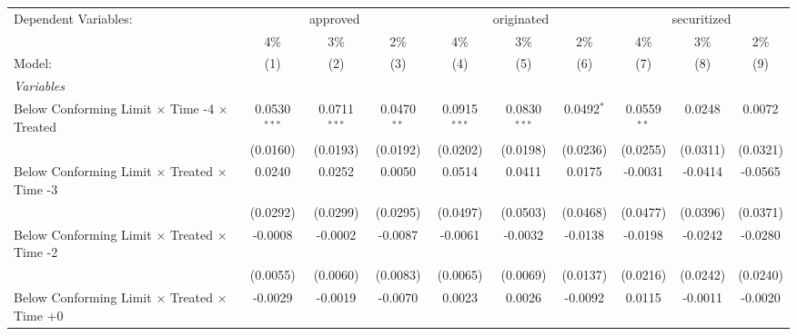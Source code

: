 \begingroup
\centering
\begin{tabular}{lccccccccc}
   \tabularnewline \midrule \midrule
   Dependent Variables: & \multicolumn{3}{c}{approved} & \multicolumn{3}{c}{originated} & \multicolumn{3}{c}{securitized}\\
                                                              & 4\%            & 3\%            & 2\%            & 4\%            & 3\%            & 2\%           & 4\%            & 3\%           & 2\% \\    
   Model:                                                     & (1)            & (2)            & (3)            & (4)            & (5)            & (6)           & (7)            & (8)           & (9)\\  
   \midrule
   \emph{Variables}\\
   Below Conforming Limit $\times$ Time -4 $\times$ Treated   & 0.0530$^{***}$ & 0.0711$^{***}$ & 0.0470$^{**}$  & 0.0915$^{***}$ & 0.0830$^{***}$ & 0.0492$^{*}$  & 0.0559$^{**}$  & 0.0248        & 0.0072\\   
                                                              & (0.0160)       & (0.0193)       & (0.0192)       & (0.0202)       & (0.0198)       & (0.0236)      & (0.0255)       & (0.0311)      & (0.0321)\\   
   Below Conforming Limit $\times$ Treated $\times$ Time -3   & 0.0240         & 0.0252         & 0.0050         & 0.0514         & 0.0411         & 0.0175        & -0.0031        & -0.0414       & -0.0565\\   
                                                              & (0.0292)       & (0.0299)       & (0.0295)       & (0.0497)       & (0.0503)       & (0.0468)      & (0.0477)       & (0.0396)      & (0.0371)\\   
   Below Conforming Limit $\times$ Treated $\times$ Time -2   & -0.0008        & -0.0002        & -0.0087        & -0.0061        & -0.0032        & -0.0138       & -0.0198        & -0.0242       & -0.0280\\   
                                                              & (0.0055)       & (0.0060)       & (0.0083)       & (0.0065)       & (0.0069)       & (0.0137)      & (0.0216)       & (0.0242)      & (0.0240)\\   
   Below Conforming Limit $\times$ Treated $\times$ Time +0   & -0.0029        & -0.0019        & -0.0070        & 0.0023         & 0.0026         & -0.0092       & 0.0115         & -0.0011       & -0.0020\\   

\end{tabular}

